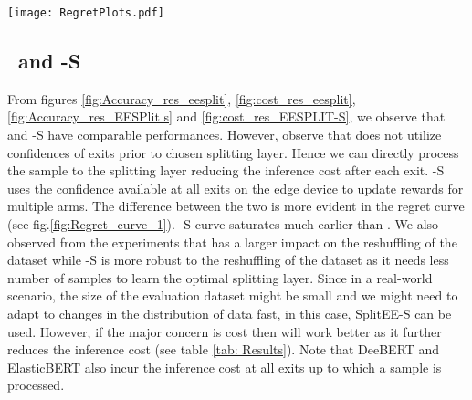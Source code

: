 \begin{figure*}
    \centering
    \texttt{[image: RegretPlots.pdf]}
    \caption{Regret for different models}
    \label{fig:Regret_curve_1}
\end{figure*}




\subsection{\our{} \ and \our{}-S}
From figures 
\ref{fig:Accuracy_res_eesplit},
\ref{fig:cost_res_eesplit}, \ref{fig:Accuracy_res_EESPlit s} and \ref{fig:cost_res_EESPLIT-S}, we observe that \our{} and \our{}-S have comparable performances. However, observe that \our{} does not utilize confidences of exits prior to chosen splitting layer. Hence we can directly process the sample to the splitting layer reducing the inference cost after each exit. \our{}-S uses the confidence available at all exits on the edge device to update rewards for multiple arms. The difference between the two is more evident in the regret curve (see fig.\ref{fig:Regret_curve_1}). \our-S curve saturates much earlier than \our{}. We also observed from the experiments that \our{} has a larger impact on the reshuffling of the dataset while \our{}-S is more robust to the reshuffling of the dataset as it needs less number of samples to learn the optimal splitting layer. Since in a real-world scenario, the size of the evaluation dataset might be small and we might need to adapt to changes in the distribution of data fast, in this case, SplitEE-S can be used. However, if the major concern is cost then \our{} will work better as it further reduces the inference cost (see table \ref{tab: Results}). Note that DeeBERT and ElasticBERT also incur the inference cost at all exits up to which a sample is processed.

